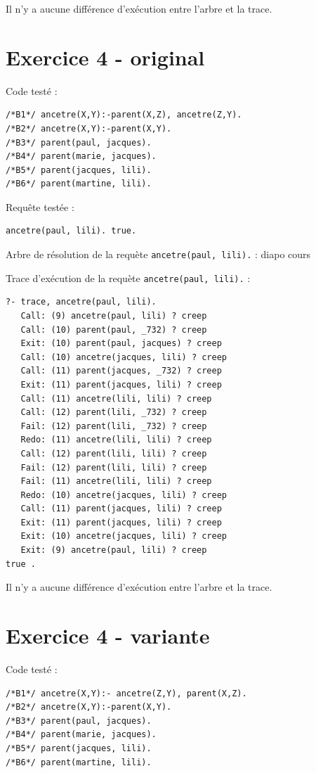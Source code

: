 \documentclass{article}
\begin{document}
Il n'y a aucune différence d'exécution entre l'arbre et la trace.

\section*{Exercice 4 - original}

Code testé :
\begin{verbatim}
/*B1*/ ancetre(X,Y):-parent(X,Z), ancetre(Z,Y).
/*B2*/ ancetre(X,Y):-parent(X,Y).
/*B3*/ parent(paul, jacques).
/*B4*/ parent(marie, jacques).
/*B5*/ parent(jacques, lili).
/*B6*/ parent(martine, lili).
\end{verbatim}

Requête testée :
\begin{verbatim}
ancetre(paul, lili). true.
\end{verbatim}

Arbre de résolution de la requète \texttt{ancetre(paul, lili).} :
diapo cours

Trace d'exécution de la requète \texttt{ancetre(paul, lili).} :
\begin{verbatim}
?- trace, ancetre(paul, lili).
   Call: (9) ancetre(paul, lili) ? creep
   Call: (10) parent(paul, _732) ? creep
   Exit: (10) parent(paul, jacques) ? creep
   Call: (10) ancetre(jacques, lili) ? creep
   Call: (11) parent(jacques, _732) ? creep
   Exit: (11) parent(jacques, lili) ? creep
   Call: (11) ancetre(lili, lili) ? creep
   Call: (12) parent(lili, _732) ? creep
   Fail: (12) parent(lili, _732) ? creep
   Redo: (11) ancetre(lili, lili) ? creep
   Call: (12) parent(lili, lili) ? creep
   Fail: (12) parent(lili, lili) ? creep
   Fail: (11) ancetre(lili, lili) ? creep
   Redo: (10) ancetre(jacques, lili) ? creep
   Call: (11) parent(jacques, lili) ? creep
   Exit: (11) parent(jacques, lili) ? creep
   Exit: (10) ancetre(jacques, lili) ? creep
   Exit: (9) ancetre(paul, lili) ? creep
true .
\end{verbatim}

Il n'y a aucune différence d'exécution entre l'arbre et la trace.

\section*{Exercice 4 - variante}

Code testé :
\begin{verbatim}
/*B1*/ ancetre(X,Y):- ancetre(Z,Y), parent(X,Z).
/*B2*/ ancetre(X,Y):-parent(X,Y).
/*B3*/ parent(paul, jacques).
/*B4*/ parent(marie, jacques).
/*B5*/ parent(jacques, lili).
/*B6*/ parent(martine, lili).
\end{verbatim}
\end{document}
